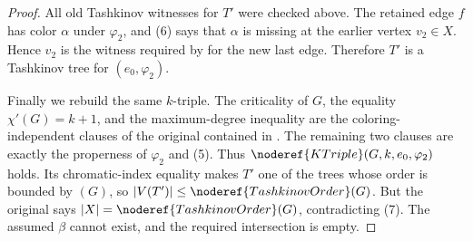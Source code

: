 \begin{proof}
All old Tashkinov witnesses for $T'$ were checked above.  The retained
edge $f$ has color $\alpha$ under $\varphi_2$, and (6) says that
$\alpha$ is missing at the earlier vertex $v_2\in X$.  Hence $v_2$ is
the witness required by  for the new last edge.
Therefore $T'$ is a Tashkinov tree for $(e_0,\varphi_2)$.

Finally we rebuild the same $k$-triple.  The criticality of $G$, the
equality $\chi'(G)=k+1$, and the maximum-degree inequality are the
coloring-independent clauses of the original  contained
in .  The remaining two clauses are exactly
the properness of $\varphi_2$ and (5).  Thus
$\noderef{KTriple}(G,k,e_0,\varphi_2)$ holds.  Its chromatic-index equality
makes $T'$ one of the trees whose order is bounded by
$(G)$, so
$|V(T')|\leq\noderef{TashkinovOrder}(G)$.  But the original
 says
$|X|=\noderef{TashkinovOrder}(G)$, contradicting (7).  The assumed
$\beta$ cannot exist, and the required intersection is empty.
\end{proof}
